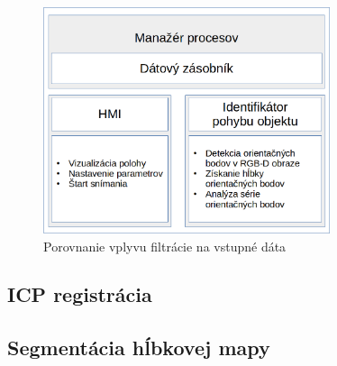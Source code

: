 \begin{figure}[H]
	\centering
	\includegraphics[width=0.75\textwidth]{figures/algorithm_faceland.png}
	\caption{Porovnanie vplyvu filtrácie na vstupné dáta}
	\label{fig:algorithm:result:a}
	\label{fig:algorithm:result:b}
	\label{fig:algorithm:result:c}
\end{figure}

\subsection{ICP registrácia}

\subsection{Segmentácia hĺbkovej mapy}